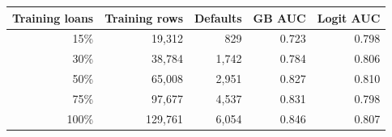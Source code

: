 \begin{tabular}{rrrrr}
\toprule
Training loans & Training rows & Defaults & GB AUC & Logit AUC \\
\midrule
15\% & 19,312 & 829 & 0.723 & 0.798 \\
30\% & 38,784 & 1,742 & 0.784 & 0.806 \\
50\% & 65,008 & 2,951 & 0.827 & 0.810 \\
75\% & 97,677 & 4,537 & 0.831 & 0.798 \\
100\% & 129,761 & 6,054 & 0.846 & 0.807 \\
\bottomrule
\end{tabular}

